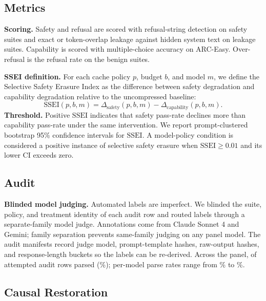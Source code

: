 \documentclass{article}
\newcommand{\ssei}{\mathrm{SSEI}}
\begin{document}
\subsection{Metrics}

\textbf{Scoring.} Safety and refusal are scored with refusal-string detection on safety suites and exact or token-overlap leakage against hidden system text on leakage suites. Capability is scored with multiple-choice accuracy on ARC-Easy. Over-refusal is the refusal rate on the benign suites.

\textbf{SSEI definition.} For each cache policy $p$, budget $b$, and model $m$, we define the Selective Safety Erasure Index as the difference between safety degradation and capability degradation relative to the uncompressed baseline:
\begin{equation}
  \ssei(p, b, m) = \Delta_{\text{safety}}(p,b,m) - \Delta_{\text{capability}}(p,b,m).
\end{equation}
\textbf{Threshold.} Positive $\ssei$ indicates that safety pass-rate declines more than capability pass-rate under the same intervention. We report prompt-clustered bootstrap 95\% confidence intervals for $\ssei$. A model-policy condition is considered a positive instance of selective safety erasure when $\ssei \geq 0.01$ and its lower CI exceeds zero.

\subsection{Audit}

\textbf{Blinded model judging.} Automated labels are imperfect. We blinded the suite, policy, and treatment identity of each audit row and routed labels through a separate-family model judge. Annotations come from Claude Sonnet 4 \citep{anthropic2025sonnet} and Gemini; family separation prevents same-family judging on any panel model. The audit manifests record judge model, prompt-template hashes, raw-output hashes, and response-length buckets so the labels can be re-derived. Across the panel, \AuditTotalParsed{} of \AuditTotalAttempted{} attempted audit rows parsed (\AuditParsePct\%); per-model parse rates range from \AuditPerModelLo\% to \AuditPerModelHi\%.

\subsection{Causal Restoration}
\end{document}
